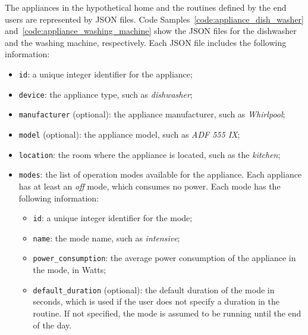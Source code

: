 The appliances in the hypothetical home and the routines defined by the end users are represented by JSON files. Code Samples~\ref{code:appliance_dish_washer} and~\ref{code:appliance_washing_machine} show the JSON files for the dishwasher and the washing machine, respectively. Each JSON file includes the following information:
\begin{itemize}
    \item \texttt{id}: a unique integer identifier for the appliance;
    \item \texttt{device}: the appliance type, such as \textit{dishwasher};
    \item \texttt{manufacturer} (optional): the appliance manufacturer, such as \textit{Whirlpool};
    \item \texttt{model} (optional): the appliance model, such as \textit{ADF 555 IX};
    \item \texttt{location}: the room where the appliance is located, such as the \textit{kitchen};
    \item \texttt{modes}: the list of operation modes available for the appliance. Each appliance has at least an \textit{off} mode, which consumes no power. Each mode has the following information:
    \begin{itemize}
        \item \texttt{id}: a unique integer identifier for the mode;
        \item \texttt{name}: the mode name, such as \textit{intensive};
        \item \texttt{power\_consumption}: the average power consumption of the appliance in the mode, in Watts; 
        \item \texttt{default\_duration} (optional): the default duration of the mode in seconds, which is used if the user does not specify a duration in the routine. If not specified, the mode is assumed to be running until the end of the day.
    \end{itemize}
\end{itemize}





